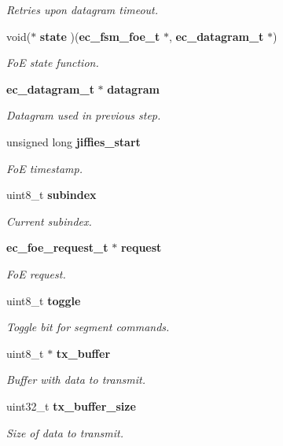 \begin{DoxyCompactItemize}
\begin{DoxyCompactList}\small\item\em \-Retries upon datagram timeout. \end{DoxyCompactList}\item 
void($\ast$ {\bf state} )({\bf ec\-\_\-fsm\-\_\-foe\-\_\-t} $\ast$, {\bf ec\-\_\-datagram\-\_\-t} $\ast$)
\begin{DoxyCompactList}\small\item\em \-Fo\-E state function. \end{DoxyCompactList}\item 
{\bf ec\-\_\-datagram\-\_\-t} $\ast$ {\bf datagram}
\begin{DoxyCompactList}\small\item\em \-Datagram used in previous step. \end{DoxyCompactList}\item 
unsigned long {\bf jiffies\-\_\-start}
\begin{DoxyCompactList}\small\item\em \-Fo\-E timestamp. \end{DoxyCompactList}\item 
uint8\-\_\-t {\bf subindex}
\begin{DoxyCompactList}\small\item\em \-Current subindex. \end{DoxyCompactList}\item 
{\bf ec\-\_\-foe\-\_\-request\-\_\-t} $\ast$ {\bf request}
\begin{DoxyCompactList}\small\item\em \-Fo\-E request. \end{DoxyCompactList}\item 
uint8\-\_\-t {\bf toggle}
\begin{DoxyCompactList}\small\item\em \-Toggle bit for segment commands. \end{DoxyCompactList}\item 
uint8\-\_\-t $\ast$ {\bf tx\-\_\-buffer}
\begin{DoxyCompactList}\small\item\em \-Buffer with data to transmit. \end{DoxyCompactList}\item 
uint32\-\_\-t {\bf tx\-\_\-buffer\-\_\-size}
\begin{DoxyCompactList}\small\item\em \-Size of data to transmit. \end{DoxyCompactList}\item 

\end{DoxyCompactItemize}

